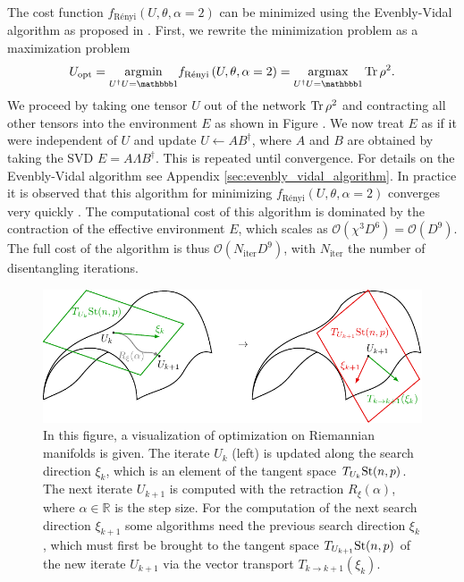 The cost function $f_\text{Rényi}\left(U,\theta,\alpha=2\right)$ can be minimized using the Evenbly-Vidal algorithm as proposed in \cite{cite:finding_purifications_with_minimal_entanglement}. First, we rewrite the minimization problem as a maximization problem
\begin{equation}
	U_\text{opt} = \underset{U^\dagger U = \id}{\argmin} f_\text{Rényi}\left(U,\theta,\alpha=2\right) = \underset{U^\dagger U = \id}{\argmax}\Tr\rho^2.
\end{equation}
We proceed by taking one tensor $U$ out of the network $\operatorname{Tr}\rho^2$ and contracting all other tensors into the environment $E$ as shown in Figure . We now treat $E$ as if it were independent of $U$ and update $U\leftarrow AB^\dagger$, where $A$ and $B$ are obtained by taking the SVD $E=A\Lambda B^\dagger$. This is repeated until convergence. For details on the Evenbly-Vidal algorithm see Appendix \ref{sec:evenbly_vidal_algorithm}. In practice it is observed that this algorithm for minimizing $f_\text{Rényi}\left(U,\theta,\alpha=2\right)$ converges very quickly \cite{cite:efficient_simulation_of_dynamics_in_two_dimensional_quantum_spin_systems}. The computational cost of this algorithm is dominated by the contraction of the effective environment $E$, which scales as $\mathcal{O}(\chi^3D^6) = \mathcal{O}(D^9)$. The full cost of the algorithm is thus $\mathcal{O}(N_\text{iter}D^9)$, with $N_\text{iter}$ the number of disentangling iterations.\par
\begin{figure}
	\centering
	\includegraphics[scale=1]{figures/tikz/YB_isoTPS/riemannian_optimization/riemannian_optimization.pdf}
	\caption{In this figure, a visualization of optimization on Riemannian manifolds is given. The iterate $U_k$ (left) is updated along the search direction $\xi_k$, which is an element of the tangent space $T_{U_k}\text{St}(n,p)$. The next iterate $U_{k+1}$ is computed with the retraction $R_\xi\left(\alpha\right)$, where $\alpha\in\mathbb{R}$ is the step size. For the computation of the next search direction $\xi_{k+1}$ some algorithms need the previous search direction $\xi_k$, which must first be brought to the tangent space $T_{U_{k+1}}\text{St}(n,p)$ of the new iterate $U_{k+1}$ via the vector transport $T_{k\rightarrow k+1}\left(\xi_k\right)$.}
	\label{fig:disentangling_riemannian_optimization}
\end{figure}
